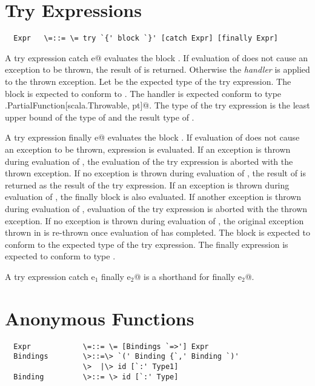 \documentclass[11pt]{report}
\begin{document}
\section{Try Expressions}

\syntax\begin{verbatim}
  Expr   \=::= \= try `{' block `}' [catch Expr] [finally Expr]
\end{verbatim}

A try expression  catch e@ evaluates the block
\verb@b@.  If evaluation of \verb@b@ does not cause an exception to be
thrown, the result of \verb@b@ is returned. Otherwise the {\em
handler} \verb@e@ is applied to the thrown exception.  Let \verb@pt@
be the expected type of the try expression.  The block \verb@b@ is
expected to conform to \verb@pt@.  The handler \verb@e@ is expected
conform to type \verb@scala.PartialFunction[scala.Throwable, pt]@.
The type of the try expression is the least upper bound of the type of
\verb@b@ and the result type of \verb@e@.

A try expression  finally e@ evaluates the block
\verb@b@.  If evaluation of \verb@b@ does not cause an exception to be
thrown, expression \verb@e@ is evaluated. If an exception is thrown
during evaluation of \verb@e@, the evaluation of the try expression is
aborted with the thrown exception. If no exception is thrown during
evaluation of \verb@e@, the result of \verb@b@ is returned as the
result of the try expression. If an exception is thrown during
evaluation of \verb@b@, the finally block
\verb@e@ is also evaluated. If another exception \verb@e@ is thrown
during evaluation of \verb@e@, evaluation of the try expression is
aborted with the thrown exception. If no exception is thrown during
evaluation of \verb@e@, the original exception thrown in \verb@b@ is
re-thrown once evaluation of \verb@e@ has completed.  The block
\verb@b@ is expected to conform to the expected type of the try
expression. The finally expression \verb@e@ is expected to conform to
type \verb@unit@.

A try expression  catch e$_1$ finally e$_2$@ is a shorthand
for   finally e$_2$@.

\section{Anonymous Functions}
\label{sec:closures}

\syntax\begin{verbatim}
  Expr            \=::= \= [Bindings `=>'] Expr
  Bindings        \>::=\> `(' Binding {`,' Binding `)'
                  \>  |\> id [`:' Type1]
  Binding         \>::= \> id [`:' Type]
\end{verbatim}
\end{document}

